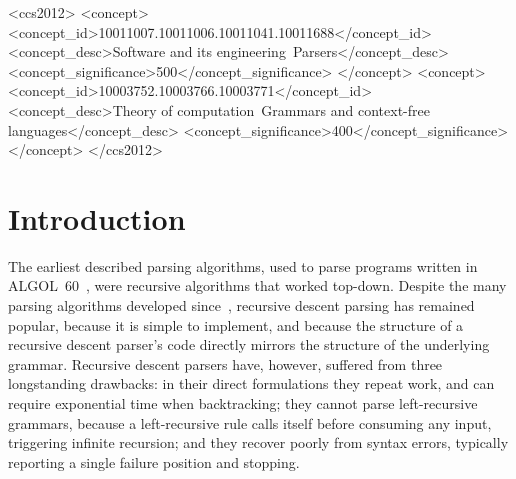 \documentclass[manuscript]{acmart}
\begin{document}
\begin{CCSXML}
<ccs2012>
   <concept>
       <concept_id>10011007.10011006.10011041.10011688</concept_id>
       <concept_desc>Software and its engineering~Parsers</concept_desc>
       <concept_significance>500</concept_significance>
   </concept>
   <concept>
       <concept_id>10003752.10003766.10003771</concept_id>
       <concept_desc>Theory of computation~Grammars and context-free languages</concept_desc>
       <concept_significance>400</concept_significance>
   </concept>
 </ccs2012>
\end{CCSXML}



\maketitle

\section{Introduction}
\label{sec:intro}

The earliest described parsing algorithms, used to parse programs written in ALGOL~60~\cite{irons1961syntax,lucas1961structure}, were recursive algorithms that worked top-down. Despite the many parsing algorithms developed since~\cite{kegler2023parsing}, recursive descent parsing has remained popular, because it is simple to implement, and because the structure of a recursive descent parser's code directly mirrors the structure of the underlying grammar. Recursive descent parsers have, however, suffered from three longstanding drawbacks: in their direct formulations they repeat work, and can require exponential time when backtracking; they cannot parse left-recursive grammars, because a left-recursive rule calls itself before consuming any input, triggering infinite recursion; and they recover poorly from syntax errors, typically reporting a single failure position and stopping.
\end{document}
